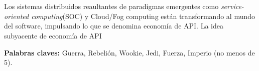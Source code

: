 \chapter*{\runtitulo}

\noindent Los sistemas distribuidos reaultantes de paradigmas emergentes como \emph{service-oriented computing}(SOC) y Cloud/Fog computing están transformando al mundo del software, impulsando lo que se denomina economía de API. La idea subyacente de economía de API

\bigskip

\noindent\textbf{Palabras claves:} Guerra, Rebelión, Wookie, Jedi, Fuerza, Imperio (no menos de 5).